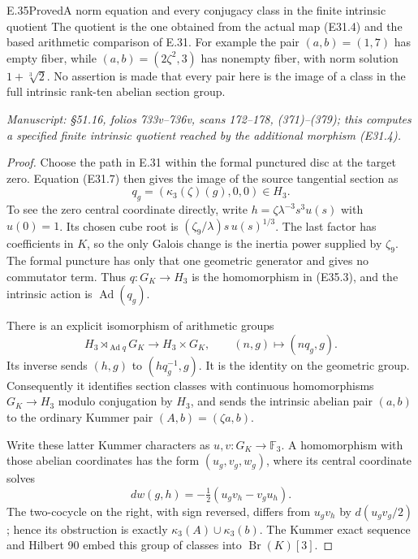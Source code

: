 \begin{statement}{E.35}{Proved}{A norm equation and every conjugacy class in the finite intrinsic quotient}
The quotient is the one obtained from the actual map (E31.4)
and the based arithmetic comparison of E.31.
For example the pair $(a,b)=(1,7)$ has empty fiber,
while $(a,b)=(2\zeta^2,3)$ has nonempty fiber, with
norm solution $1+\sqrt[3]{2}$.
No assertion is made that every pair here is the image of
a class in the full intrinsic rank-ten abelian section group.

\emph{Manuscript: \S51.16, folios 733v--736v, scans 172--178,
(371)--(379); this computes a specified finite intrinsic
quotient reached by the additional morphism (E31.4).}
\end{statement}
\begin{proof}
Choose the path in E.31 within the formal punctured disc
at the target zero. Equation (E31.7) then gives the image
of the source tangential section as
\[
 q_g=(\kappa_3(\zeta)(g),0,0)\in H_3 .
 \tag{E35.3}
\]
To see the zero central coordinate directly, write
$h=\zeta\lambda^{-3}s^3u(s)$ with $u(0)=1$.
Its chosen cube root is
$(\zeta_9/\lambda)s\,u(s)^{1/3}$.
The last factor has coefficients in $K$, so the only
Galois change is the inertia power supplied by
$\zeta_9$. The formal puncture has only that one
geometric generator and gives no commutator term.
Thus $q:G_K\to H_3$ is the homomorphism in (E35.3),
and the intrinsic action is $\operatorname{Ad}(q_g)$.

There is an explicit isomorphism of arithmetic groups
\[
 H_3\rtimes_{\operatorname{Ad}q}G_K
       \longrightarrow H_3\times G_K,\qquad
 (n,g)\longmapsto(nq_g,g).
 \tag{E35.4}
\]
Its inverse sends $(h,g)$ to $(hq_g^{-1},g)$.
It is the identity on the geometric group.
Consequently it identifies section classes with continuous
homomorphisms $G_K\to H_3$ modulo conjugation by $H_3$,
and sends the intrinsic abelian pair $(a,b)$ to the
ordinary Kummer pair $(A,b)=(\zeta a,b)$.

Write these latter Kummer characters as $u,v:G_K\to\mathbb F_3$.
A homomorphism with those abelian coordinates has the form
$(u_g,v_g,w_g)$, where its central coordinate solves
\[
 d w(g,h)=-\tfrac12(u_gv_h-v_gu_h).
 \tag{E35.5}
\]
The two-cocycle on the right, with sign reversed, differs
from $u_gv_h$ by
$d(u_gv_g/2)$; hence its obstruction is exactly
$\kappa_3(A)\cup\kappa_3(b)$.
The Kummer exact sequence and Hilbert 90 embed this group
of classes into $\operatorname{Br}(K)[3]$.


\end{proof}
